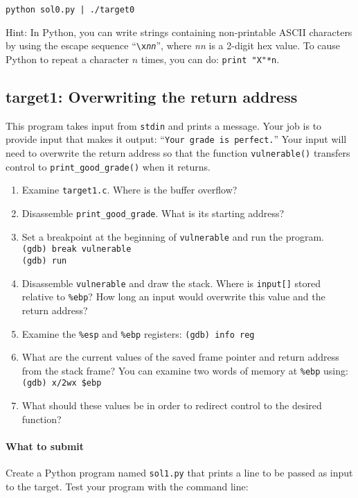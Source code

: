 \documentclass[letterpaper,12pt]{report}
\begin{document}
{\smallskip

\quad\texttt{python sol0.py | ./target0}

\medskip

Hint: In Python, you can write strings containing non-printable ASCII characters by using the escape sequence ``\texttt{\textbackslash x\emph{nn}}'', where \emph{nn} is a 2-digit hex value.  To cause Python to repeat a character $n$ times, you can do: \texttt{print "X"*n}.

\subsection*{target1: Overwriting the return address}
\label{sec:target1}

This program takes input from \texttt{stdin} and prints a message.  Your job is to provide input that makes it output: ``\texttt{Your grade is perfect.}''  Your input will need to overwrite the return address so that the function \texttt{vulnerable()} transfers control to \texttt{print\_good\_grade()} when it returns.

\begin{enumerate}
\item Examine \texttt{target1.c}.  Where is the buffer overflow?
\item Disassemble \texttt{print\_good\_grade}.  What is its starting address?
\item Set a breakpoint at the beginning of \texttt{vulnerable} and run the program.\\
\texttt{(gdb) break vulnerable}\\
\texttt{(gdb) run}
\item Disassemble \texttt{vulnerable} and draw the stack.  Where is \texttt{input[]} stored relative to \texttt{\%ebp}?  How long an input would overwrite this value and the return address?
\item Examine the \texttt{\%esp} and \texttt{\%ebp} registers: \texttt{(gdb) info reg}
\item What are the current values of the saved frame pointer and return address from the stack frame?  You can examine two words of memory at \texttt{\%ebp} using:
\texttt{(gdb) x/2wx \$ebp}
\item What should these values be in order to redirect control to the desired function?
\end{enumerate}

\paragraph{What to submit}
Create a Python program named \texttt{sol1.py} that prints a line to be passed as input to the target.  Test your program with the command line:

}
\end{document}
